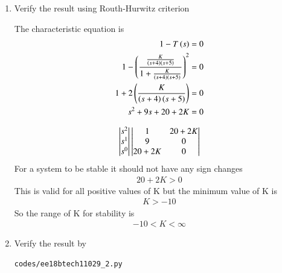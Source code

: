 \begin{enumerate}[label=\thesubsection.\arabic*.,ref=\thesubsection.\theenumi]
\item Verify the result using Routh-Hurwitz criterion

\solution The characteristic equation is 
\begin{align}
    1-T\left(s\right) &=0\\
    1-\left(\frac{\frac{K}{\left(s+4\right)\left(s+5\right)}}{1+\frac{K}{\left(s+4\right)\left(s+5\right)}}\right)^2 &=0\\
    1+2\left(\frac{K}{\left(s+4\right)\left(s+5\right)}\right)&=0\\
    s^2+9s+20+2K &= 0
\end{align}

\begin{align}
\begin{vmatrix}s^2\\s^1\\s^0\end{vmatrix}
\begin{vmatrix}1 & 20+2K \\ 9 & 0 \\ 20+2K & 0\end{vmatrix}
\end{align}
For a system to be stable it should not have any sign changes
\begin{align}
    20+2K >0
\end{align}
This is valid for all positive values of K but the minimum value of K is
\begin{align}
    K>-10
\end{align}
So the range of K for stability is 
\begin{align}
    -10<K<\infty
\end{align}

\item Verify the result by
\begin{lstlisting}
codes/ee18btech11029_2.py
\end{lstlisting}







\end{enumerate}
